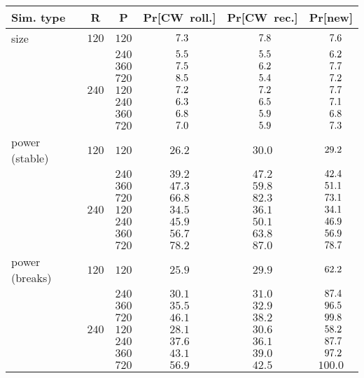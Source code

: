 \begin{tabularx}{\textwidth}{lCCCCC}
  \toprule Sim. type & R & P & Pr[CW~roll.] & Pr[CW~rec.] & Pr[new] \\ 
  \midrule size & $120$ & $120$ & $\enskip7.3$ & $\enskip7.8$ & $\enskip\enskip7.6$ \\ 
   &  & $240$ & $\enskip5.5$ & $\enskip5.5$ & $\enskip\enskip6.2$ \\ 
   &  & $360$ & $\enskip7.5$ & $\enskip6.2$ & $\enskip\enskip7.7$ \\ 
   &  & $720$ & $\enskip8.5$ & $\enskip5.4$ & $\enskip\enskip7.2$ \\ 
   & $240$ & $120$ & $\enskip7.2$ & $\enskip7.2$ & $\enskip\enskip7.7$ \\ 
   &  & $240$ & $\enskip6.3$ & $\enskip6.5$ & $\enskip\enskip7.1$ \\ 
   &  & $360$ & $\enskip6.8$ & $\enskip5.9$ & $\enskip\enskip6.8$ \\ 
   &  & $720$ & $\enskip7.0$ & $\enskip5.9$ & $\enskip\enskip7.3$ \\ 
  power (stable) & $120$ & $120$ & $26.2$ & $30.0$ & $\enskip29.2$ \\ 
   &  & $240$ & $39.2$ & $47.2$ & $\enskip42.4$ \\ 
   &  & $360$ & $47.3$ & $59.8$ & $\enskip51.1$ \\ 
   &  & $720$ & $66.8$ & $82.3$ & $\enskip73.1$ \\ 
   & $240$ & $120$ & $34.5$ & $36.1$ & $\enskip34.1$ \\ 
   &  & $240$ & $45.9$ & $50.1$ & $\enskip46.9$ \\ 
   &  & $360$ & $56.7$ & $63.8$ & $\enskip56.9$ \\ 
   &  & $720$ & $78.2$ & $87.0$ & $\enskip78.7$ \\ 
  power (breaks) & $120$ & $120$ & $25.9$ & $29.9$ & $\enskip62.2$ \\ 
   &  & $240$ & $30.1$ & $31.0$ & $\enskip87.4$ \\ 
   &  & $360$ & $35.5$ & $32.9$ & $\enskip96.5$ \\ 
   &  & $720$ & $46.1$ & $38.2$ & $\enskip99.8$ \\ 
   & $240$ & $120$ & $28.1$ & $30.6$ & $\enskip58.2$ \\ 
   &  & $240$ & $37.6$ & $36.1$ & $\enskip87.7$ \\ 
   &  & $360$ & $43.1$ & $39.0$ & $\enskip97.2$ \\ 
   &  & $720$ & $56.9$ & $42.5$ & $100.0$ \\ 
   \bottomrule \end{tabularx}
